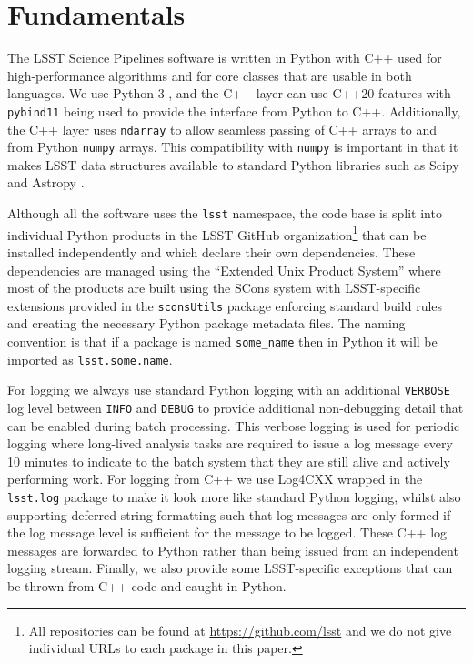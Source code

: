 \section{Fundamentals}
\label{sec:support}

The LSST Science Pipelines software is written in Python with C++ used for high-performance algorithms and for core classes that are usable in both languages.
We use Python 3 \citep[having ported from python 2,][currently with a minimum version of Python 3.12]{2020ASPC..522..541J}, and the C++ layer can use C++20 features with \texttt{pybind11} being used to provide the interface from Python to C++.
Additionally, the C++ layer uses \texttt{ndarray} to allow seamless passing of C++ arrays to and from Python \texttt{numpy} arrays.
This compatibility with \texttt{numpy} is important in that it makes LSST data structures available to standard Python libraries such as Scipy and Astropy \citep{2016SPIE.9913E..0GJ,2018AJ....156..123A}.

Although all the software uses the \texttt{lsst} namespace, the code base is split into individual Python products in the LSST GitHub organization\footnote{All repositories can be found at \url{https://github.com/lsst} and we do not give individual URLs to each package in this paper.} that can be installed independently and which declare their own dependencies.
These dependencies are managed using the ``Extended Unix Product System'' \citep[EUPS;][]{EUPS,2018SPIE10707E..09J} where
most of the products are built using the SCons system \citep{2005Scons1377085} with LSST-specific extensions provided in the \texttt{sconsUtils} package enforcing standard build rules and creating the necessary Python package metadata files.
The naming convention is that if a package is named \texttt{some\_name} then in Python it will be imported as \texttt{lsst.some.name}.

For logging we always use standard Python logging with an additional \texttt{VERBOSE} log level between \texttt{INFO} and \texttt{DEBUG} to provide additional non-debugging detail that can be enabled during batch processing.
This verbose logging is used for periodic logging where long-lived analysis tasks are required to issue a log message every 10 minutes to indicate to the batch system that they are still alive and actively performing work.
For logging from C++ we use Log4CXX wrapped in the \texttt{lsst.log} package to make it look more like standard Python logging, whilst also supporting deferred string formatting such that log messages are only formed if the log message level is sufficient for the message to be logged.
These C++ log messages are forwarded to Python rather than being issued from an independent logging stream.
Finally, we also provide some LSST-specific exceptions that can be thrown from C++ code and caught in Python.

